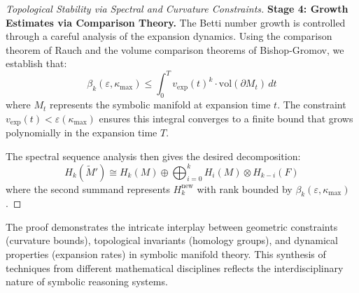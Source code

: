 \begin{proof}[Topological Stability via Spectral and Curvature Constraints]
\textbf{Stage 4: Growth Estimates via Comparison Theory.}
The Betti number growth is controlled through a careful analysis of the expansion dynamics. Using the comparison theorem of Rauch and the volume comparison theorems of Bishop-Gromov, we establish that:
\[
\beta_k(\varepsilon, \kappa_{\max}) \leq \int_0^T v_{\text{exp}}(t)^k \cdot \text{vol}(\partial M_t) \, dt
\]
where $M_t$ represents the symbolic manifold at expansion time $t$. The constraint $v_{\text{exp}}(t) < \varepsilon(\kappa_{\max})$ ensures this integral converges to a finite bound that grows polynomially in the expansion time $T$.

The spectral sequence analysis then gives the desired decomposition:
\[
H_k(\widetilde{M}') \cong H_k(M) \oplus \bigoplus_{i=0}^{k} H_i(M) \otimes H_{k-i}(F)
\]
where the second summand represents $H_k^{\mathrm{new}}$ with rank bounded by $\beta_k(\varepsilon, \kappa_{\max})$.
\end{proof}

The proof demonstrates the intricate interplay between geometric constraints (curvature bounds), topological invariants (homology groups), and dynamical properties (expansion rates) in symbolic manifold theory. This synthesis of techniques from different mathematical disciplines reflects the interdisciplinary nature of symbolic reasoning systems.


